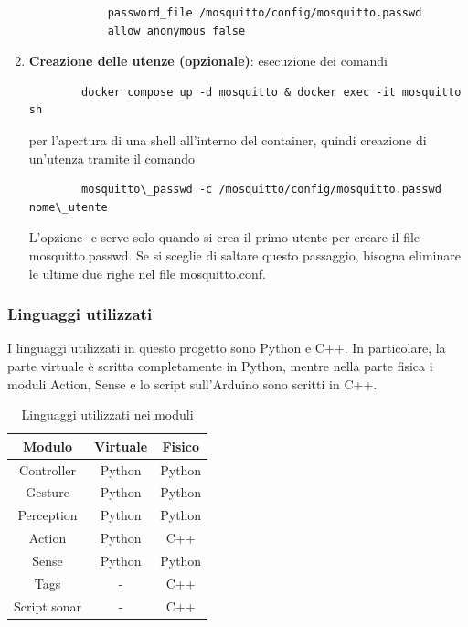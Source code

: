 \documentclass[]{article}
\begin{document}
\begin{enumerate}
\begin{center}
\begin{verbatim}
            password_file /mosquitto/config/mosquitto.passwd
            allow_anonymous false
        \end{verbatim}
    \end{center}
    \item \textbf{Creazione delle utenze (opzionale)}: esecuzione dei comandi 
    \begin{verbatim}
        docker compose up -d mosquitto & docker exec -it mosquitto sh
    \end{verbatim}
    per l'apertura di una shell all'interno del container, quindi creazione di un'utenza tramite il comando 
    \begin{verbatim}
        mosquitto\_passwd -c /mosquitto/config/mosquitto.passwd nome\_utente
    \end{verbatim}
    L'opzione -c serve solo quando si crea il primo utente per creare il file mosquitto.passwd. Se si sceglie di saltare questo passaggio, bisogna eliminare le ultime due righe nel file mosquitto.conf.

\end{enumerate}

\subsubsection{Linguaggi utilizzati}

I linguaggi utilizzati in questo progetto sono Python e C++. In particolare, la parte virtuale è scritta completamente in Python, mentre nella parte fisica i moduli Action, Sense e lo script sull'Arduino sono scritti in C++.

\begin{table}[htbp]
    \centering
    \begin{tabular}{|c|c|c|}
        \hline
        Modulo       & Virtuale & Fisico \\
        \hline
        Controller   & Python   & Python \\
        Gesture      & Python   & Python \\
        Perception   & Python   & Python \\
        Action       & Python   & C++    \\
        Sense        & Python   & Python \\
        Tags         & -        & C++    \\
        Script sonar & -        & C++    \\
        \hline
    \end{tabular}
    \caption{Linguaggi utilizzati nei moduli}

\end{table}
\end{document}
